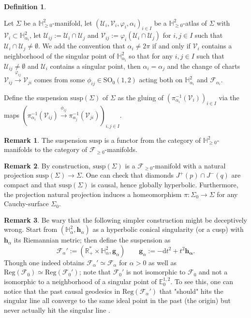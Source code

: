 \documentclass[a4paper,12pt]{article}
\def\H{\mathbb{H}}
\def\U{\mathcal U}
\def\GGL{\SO_0(1,2)}
\def\V{\mathcal V}
\def\SO{\mathrm{SO}}
\def\RR{\mathbb{R}}
\newcommand{\mass}[1]{{\mathbb E}^{1,2}_{#1}}
\def\Reg{\mathrm{Reg}}
\def\susp{\mathrm{susp}}
\def\reg{\Reg}
\def\V{\mathcal V}
\def\SO{\mathrm{SO}}
\def\Future{\mathcal F}
\def\reg{\mathrm{Reg}}
\def\U{\mathcal{U}}
\def\Reg{\mathrm{Reg}}
\def\susp{\mathrm{susp}}
\theoremstyle{definition}
\newtheorem{defi}[lem]{Definition}	%
\newtheorem*{rem}{Remark}			 %
\begin{document}
		\begin{defi}  \label{defi:Hsusp}
		
		Let $\Sigma$ be a $\H^2_{\geq0}$-manifold, let $(\U_i,\V_i,\varphi_i,\alpha_i)_{i\in I}$ be a $\H^2_{\geq0}$-atlas of $\Sigma$ with $\V_i\subset \H^2_{\alpha_i}$, let $\U_{ij}:=\U_i\cap \U_j$ and $\V_{ij}:=\varphi_i(\U_i\cap \U_j)$ for $i,j\in I$ such that $\U_i\cap \U_j\neq \emptyset$. We add the convention that $\alpha_i\neq 2\pi$ if and only if $\V_i$ contains a neighborhood of the singular point of $\H^2_{\alpha_i}$ so that for any $i,j\in I$ such that $\U_{ij}\neq \emptyset$ and $\U_i$ contains a singular point, then $\alpha_i=\alpha_j$ and the change of charts $\V_{ij}\xrightarrow{\varphi_{ij}} \V_{ji}$ comes from some $\phi_{ij}\in \GGL$ acting both on $\H^2_{\alpha_i}$ and $\Future_{\alpha_i}$.
		
		 Define the suspension $\susp(\Sigma)$ of $\Sigma$ as the gluing of $\left(\pi_{\alpha_i}^{-1}(\V_i)\right)_{i\in I}$ via the maps $\left(\pi_{\alpha_i}^{-1}(\V_{ij}) \xrightarrow{\phi_{ij}} \pi_{\alpha_j}^{-1}(\V_{ji})\right)_{i,j\in I}$.
		\end{defi}
		\begin{rem} The suspension $\susp$ is a functor from the category of $\H^2_{\geq0}$-manifolds to the category of $\Future_{\geq0}$-manifolds.
		 
		\end{rem}

		
		\begin{rem} By construction, $\susp(\Sigma)$ is a $\Future_{\geq0}$-manifold with a natural projection $\susp(\Sigma) \rightarrow \Sigma$. One can check that diamonds $J^+(p)\cap J^-(q)$ are compact and that $\susp(\Sigma)$ is causal, hence globally hyperbolic. Furthermore, the projection natural projection induces a homeomorphism $\pi: \Sigma_0 \rightarrow \Sigma$ for any Cauchy-surface $\Sigma_0$.
		
		 
		\end{rem}
		\begin{rem} Be wary that the following simpler construction might be deceptively wrong. Start from $(\H^2_\alpha,\mathbf h_\alpha)$ as a hyperbolic conical singularity (or a cusp) with $\mathbf h_\alpha$ its Riemannian metric; then define the suspension as 
		$$ \Future_\alpha':= (\RR_+^*\times \H^2_\alpha,\mathbf{g}_\alpha) \quad \quad \mathbf{g}_\alpha:= -\mathrm d t^2 + t^2 \mathbf{h_\alpha}.$$
		Though one indeed obtains $\Future_\alpha'\simeq \Future_\alpha$ for $\alpha>0$ as well as $\reg(\Future_0)\simeq \reg(\Future_0')$; note that $\Future_0'$ is not isomorphic to $\Future_0$ and not a isomorphic to a neighborhood of a singular point of $\mass{0}$. 
		To see this, one can notice that the past causal geodesics in $\reg(\Future_\alpha')$ that "should" hits the singular line all converge to the same ideal point in the past (the origin) but never actually hit the singular line .
		 
		\end{rem}
\end{document}
